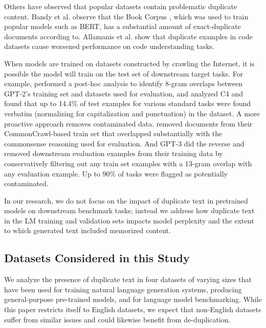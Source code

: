Others have observed that popular datasets contain problematic duplicate content.
Bandy et al. \citep{bandy2021addressing} observe that the  Book Corpus \citep{zhu2015aligning}, which was used to train popular models such as BERT, has a substantial amount of exact-duplicate documents according to.
Allamanis et al. \citet{allamanis2019adverse} show that duplicate examples in code datasets cause worsened performance on code understanding tasks.

When models are trained on datasets constructed by crawling the Internet, it is possible the model will train on the test set of downstream target tasks.
For example, \citet[\S{}4]{radford2019language} performed a post-hoc analysis to identify 8-gram overlaps between GPT-2's training set and datasets used for evaluation,
and \citet{Dodge2021-lb} analyzed C4 and found that up to 14.4\%  of test examples for various standard tasks were found verbatim (normalizing for capitalization and punctuation) in the dataset.
A more proactive approach removes contaminated data.
\citet[Appendix B]{trinh2018simple} removed documents from their CommonCrawl-based train set that overlapped substantially with the commonsense reasoning used for evaluation.
And GPT-3 \cite[\S{}5]{brown2020language} did the reverse and removed downstream evaluation examples from their training data by conservatively filtering out any train set examples with a 13-gram overlap with any evaluation example.
Up to $90\%$ of tasks were flagged as potentially contaminated.

In our research, we do not focus on the impact of duplicate text in pretrained models on downstream benchmark tasks; instead we address how duplicate text in the LM training and validation sets impacts model perplexity and the extent to which generated text included memorized content.


\subsection{Datasets Considered in this Study}
We analyze the presence of duplicate text in four datasets of varying sizes that have been used for training natural language generation systems, producing general-purpose pre-trained models, and for language model benchmarking.
While this paper restricts itself to English datasets, we expect that non-English datasets suffer from similar issues and could likewise benefit from de-duplication.

